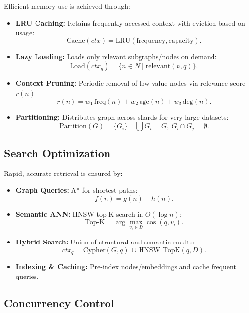 \documentclass[11pt]{article}
\begin{document}
Efficient memory use is achieved through:

\begin{itemize}
  \item \textbf{LRU Caching:} Retains frequently accessed context with eviction based on usage:
    \[
      \mathrm{Cache}(ctx) = \mathrm{LRU}(\mathrm{frequency},\mathrm{capacity}).
    \]
  \item \textbf{Lazy Loading:} Loads only relevant subgraphs/nodes on demand:
    \[
      \mathrm{Load}(ctx_q) = \{n \in N \mid \mathrm{relevant}(n,q)\}.
    \]
  \item \textbf{Context Pruning:} Periodic removal of low-value nodes via relevance score \(r(n)\):
    \[
      r(n) = w_1\,\mathrm{freq}(n) + w_2\,\mathrm{age}(n) + w_3\,\mathrm{deg}(n).
    \]
  \item \textbf{Partitioning:} Distributes graph across shards for very large datasets:
    \[
      \mathrm{Partition}(G)=\{G_i\}\quad \bigcup G_i=G,\ G_i\cap G_j=\emptyset.
    \]
\end{itemize}

\subsection{Search Optimization}
\label{subsec:search_optimization}

Rapid, accurate retrieval is ensured by:

\begin{itemize}
  \item \textbf{Graph Queries:} A* for shortest paths:
    \[
      f(n)=g(n)+h(n).
    \]
  \item \textbf{Semantic ANN:} HNSW top-K search in \(O(\log n)\):
    \[
      \mathrm{Top\text{-}K} = \arg\max_{v_i\in D}\cos(q,v_i).
    \]
  \item \textbf{Hybrid Search:} Union of structural and semantic results:
    \[
      ctx_q = \mathrm{Cypher}(G,q)\,\cup\,\mathrm{HNSW\_TopK}(q,D).
    \]
  \item \textbf{Indexing \& Caching:} Pre-index nodes/embeddings and cache frequent queries.
\end{itemize}

\subsection{Concurrency Control}
\label{subsec:concurrency_control}
\end{document}
